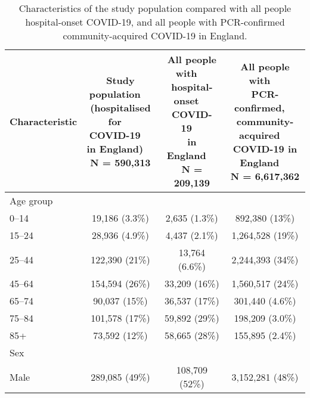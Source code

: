 
\begin{longtable}[t]{lccc}
\caption{\label{tab:sus_characteristics}Characteristics of the study population compared with all people hospital-onset COVID-19, and all people with PCR-confirmed community-acquired COVID-19 in England.}\\
\toprule
\textbf{Characteristic} & \makecell[c]{\textbf{Study population}\ \ \\ \textbf{(hospitalised for}\ \ \\ \textbf{COVID-19}\ \ \\ \textbf{in England)}\ \ \\N = 590,313} & \makecell[c]{\textbf{All people with}\ \ \\ \textbf{hospital-onset}\ \ \\ \textbf{COVID-19}\ \ \\ \textbf{in England}\ \ \\N = 209,139} & \makecell[c]{\textbf{All people with}\ \ \\ \textbf{PCR-confirmed,}\ \ \\ \textbf{community-acquired}\ \ \\ \textbf{COVID-19 in England}\ \ \\N = 6,617,362}\\
\midrule
Age group &  &  & \\
\hspace{1em}0--14 & 19,186 (3.3\%) & 2,635 (1.3\%) & 892,380 (13\%)\\
\hspace{1em}15--24 & 28,936 (4.9\%) & 4,437 (2.1\%) & 1,264,528 (19\%)\\
\hspace{1em}25--44 & 122,390 (21\%) & 13,764 (6.6\%) & 2,244,393 (34\%)\\
\hspace{1em}45--64 & 154,594 (26\%) & 33,209 (16\%) & 1,560,517 (24\%)\\
\hspace{1em}65--74 & 90,037 (15\%) & 36,537 (17\%) & 301,440 (4.6\%)\\
\hspace{1em}75--84 & 101,578 (17\%) & 59,892 (29\%) & 198,209 (3.0\%)\\
\hspace{1em}85+ & 73,592 (12\%) & 58,665 (28\%) & 155,895 (2.4\%)\\
Sex &  &  & \\
\hspace{1em}Male & 289,085 (49\%) & 108,709 (52\%) & 3,152,281 (48\%)\\

\end{longtable}
